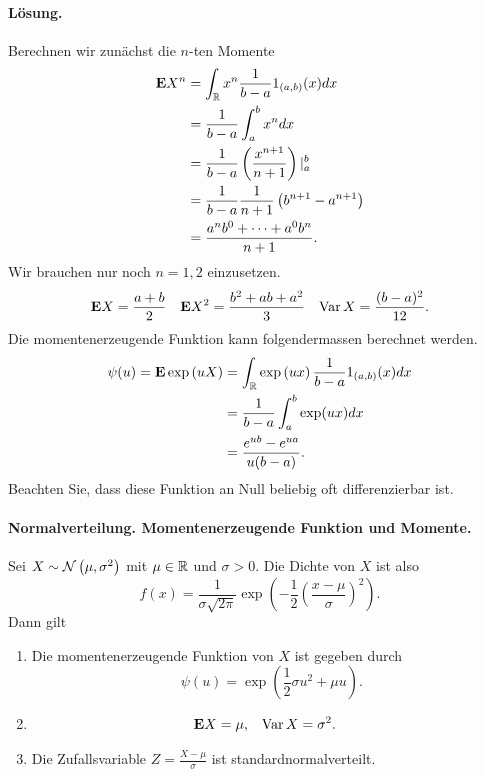 \paragraph*{Lösung.} Berechnen wir zunächst die $n$-ten Momente
\begin{align*}
    \mathbf{E} X^n &= \int_{\mathbb R}^{} x^n \frac{1}{b-a} 1_{(a,b)}(x) dx \\
    &= \frac{1}{b-a} \int_{a}^{b} x^n dx \\
    &= \frac{1}{b-a} \left( \frac{x^{n+1}}{n+1} \right) |_{a}^{b} \\
    &= \frac{1}{b-a}\frac{1}{n+1} \left( b^{n+1}-a^{n+1} \right) \\
    &= \frac{a^n b^{0} +\cdots+ a^0 b^{n}}{n+1}.
\end{align*}
Wir brauchen nur noch $n=1,2$ einzusetzen.
\begin{align*}
    \mathbf{E} X &= \frac{a+b}{2} & \mathbf{E} X^2 &= \frac{b^2 + ab + a^2}{3} & 
    \operatorname{Var} X = \frac{(b-a)^2}{12}.
\end{align*}
Die momentenerzeugende Funktion kann folgendermassen berechnet werden. 
\begin{align*}
    \psi(u) = \mathbf{E} \exp\left( uX \right) &= 
    \int_{\mathbb R} \exp \left( ux \right) \frac{1}{b-a} 1_{(a,b)}(x) dx \\
    &= \frac{1}{b-a} \int_{a}^{b} \exp (ux) dx \\
    &= \frac{e^{ub}-e^{ua}}{u(b-a)}.
\end{align*}
Beachten Sie, dass diese Funktion an Null beliebig oft differenzierbar ist. 


\paragraph{Normalverteilung. Momentenerzeugende Funktion und Momente.}
Sei $X \sim \mathcal N \left( \mu, \sigma^{2} \right)$ mit $\mu\in\mathbb R$ und $\sigma>0$. 
Die Dichte von $X$ ist also
\begin{equation*}
    f(x) = \frac{1}{\sigma \sqrt{2\pi}}
    \exp \left( -\frac{1}{2} \left( \frac{x-\mu}{\sigma} \right)^2\right).
\end{equation*}
Dann gilt
\begin{enumerate}
    \item Die momentenerzeugende Funktion von $X$ ist gegeben durch 
        \begin{equation*}
            \psi(u) = \exp \left( \frac{1}{2} \sigma u^2 + \mu u \right).
        \end{equation*}
    \item 
        \begin{align*}
            \mathbf{E} X &= \mu, & \operatorname{Var} X &= \sigma^2.
        \end{align*}
    \item Die Zufallsvariable $Z = \frac{X-\mu}{\sigma}$ ist standardnormalverteilt.
\end{enumerate}
